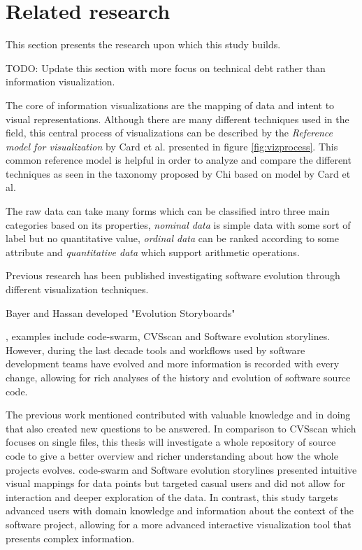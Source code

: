 

\section{Related research}

This section presents the research upon which this study builds.

TODO: Update this section with more focus on technical debt rather than information visualization.

The core of information visualizations are the mapping of data and intent to visual representations. Although there are many different techniques used in the field, this central process of visualizations can be described by the \textit{Reference model for visualization} by Card et al. presented in figure \ref{fig:vizprocess}. \cite{card_readings_1999} 
This common reference model is helpful in order to analyze and compare the different techniques as seen in the taxonomy proposed by Chi based on model by Card et al. \cite{chi_taxonomy_2000}



The raw data can take many forms which can be classified intro three main categories based on its properties, \textit{nominal data} is simple data with some sort of label but no quantitative value, \textit{ordinal data} can be ranked according to some attribute and \textit{quantitative data} which support arithmetic operations. \cite{card_structure_1997}

Previous research has been published investigating software evolution through different visualization techniques. 


Bayer and Hassan developed "Evolution Storyboards"


, examples include code-swarm, CVSscan and Software evolution storylines. However, during the last decade tools and workflows used by software development teams have evolved and more information is recorded with every change, allowing for rich analyses of the history and evolution of software source code.

The previous work mentioned contributed with valuable knowledge and in doing that also created new questions to be answered.
In comparison to CVSscan which focuses on single files, this thesis will investigate a whole repository of source code to give a better overview and richer understanding about how the whole projects evolves.
code-swarm and Software evolution storylines presented intuitive visual mappings for data points but targeted casual users and did not allow for interaction and deeper exploration of the data.
In contrast, this study targets advanced users with domain knowledge and information about the context of the software project, allowing for a more advanced interactive visualization tool that presents complex information.
